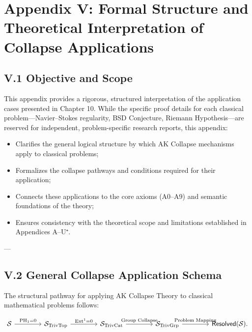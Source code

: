 \documentclass[11pt]{article}
\begin{document}

\section*{Appendix V: Formal Structure and Theoretical Interpretation of Collapse Applications}

\subsection*{V.1 Objective and Scope}

This appendix provides a rigorous, structured interpretation of the application cases presented in Chapter 10.  
While the specific proof details for each classical problem—Navier–Stokes regularity, BSD Conjecture, Riemann Hypothesis—are reserved for independent, problem-specific research reports, this appendix:

\begin{itemize}
    \item Clarifies the general logical structure by which AK Collapse mechanisms apply to classical problems;
    \item Formalizes the collapse pathways and conditions required for their application;
    \item Connects these applications to the core axioms (A0–A9) and semantic foundations of the theory;
    \item Ensures consistency with the theoretical scope and limitations established in Appendices A–U⁺.
\end{itemize}

---

\subsection*{V.2 General Collapse Application Schema}

The structural pathway for applying AK Collapse Theory to classical mathematical problems follows:

\[
\begin{tikzcd}[column sep=4em]
\mathcal{S} \arrow[r, "\mathrm{PH}_1 = 0"]
& \mathcal{S}_{\mathrm{TrivTop}} \arrow[r, "\mathrm{Ext}^1 = 0"]
& \mathcal{S}_{\mathrm{TrivCat}} \arrow[r, "\text{Group Collapse}"]
& \mathcal{S}_{\mathrm{TrivGrp}} \arrow[r, "\text{Problem Mapping}"]
& \mathsf{Resolved}(\mathcal{S}).
\end{tikzcd}
\]
\end{document}
